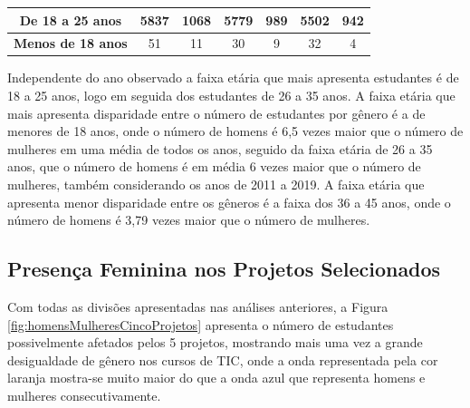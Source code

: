 \begin{table}[H]
{\begin{tabular}{c|cc|cc|cc|}
\multicolumn{1}{|c|}{\cellcolor[HTML]{C0C0C0}\textbf{De 18 a 25 anos}}  & \multicolumn{1}{c|}{5837}                                    & 1068                                      & \multicolumn{1}{c|}{5779}                                    & 989                                       & \multicolumn{1}{c|}{5502}                                    & 942                                       \\ \hline
\multicolumn{1}{|c|}{\cellcolor[HTML]{C0C0C0}\textbf{Menos de 18 anos}} & \multicolumn{1}{c|}{51}                                      & 11                                        & \multicolumn{1}{c|}{30}                                      & 9                                         & \multicolumn{1}{c|}{32}                                      & 4                                         \\ \hline
\end{tabular}%
}
\end{table}

Independente do ano observado a faixa etária que mais apresenta estudantes é de 18 a 25 anos, logo em seguida dos estudantes de 26 a 35 anos. A faixa etária que mais apresenta disparidade entre o número de estudantes por gênero é a de menores de 18 anos, onde o número de homens é  6,5 vezes maior que o número de mulheres em uma média de todos os anos, seguido da faixa etária de 26 a 35 anos, que o número de homens é em média 6 vezes maior que o número de mulheres, também considerando os anos de 2011 a 2019. A faixa etária que apresenta menor disparidade entre os gêneros é a faixa dos 36 a 45 anos, onde o número de homens é 3,79 vezes maior que o número de mulheres.

\subsection{Presença Feminina nos Projetos Selecionados}\label{sub:mulherHomemProjeto}

Com todas as divisões apresentadas nas análises anteriores, a Figura \ref{fig:homensMulheresCincoProjetos} apresenta o número de estudantes possivelmente afetados pelos 5 projetos, mostrando mais uma vez a grande desigualdade de gênero nos cursos de TIC, onde a onda representada pela cor laranja mostra-se muito maior do que a onda azul que representa homens e mulheres consecutivamente.

